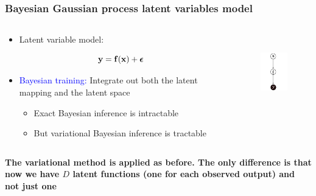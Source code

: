 \documentclass{beamer}
\begin{document}
\frame
{
\frametitle{Bayesian Gaussian process latent variables model}


\begin{columns}
\begin{column}[t]{8cm}

\begin{itemize}
\item Latent variable model: 

$$
\mathbf{y}  = \mathbf{f}(\mathbf{x})  + \boldsymbol{\epsilon} 
$$

\item \textcolor{blue}{Bayesian training:} Integrate out both the latent mapping 
      and the latent space  

\begin{itemize}

\item Exact Bayesian inference is intractable 

\item But variational Bayesian inference is tractable 
 

\end{itemize}
\end{itemize}

\end{column}

\begin{column}[t]{4cm}
\begin{figure}
\includegraphics[width=25mm,height=33mm]{../../../vargplvm/tex/diagrams/Figure1}
\end{figure}

\end{column}
\end{columns}

\vspace{0.5cm}
 

{\bf The variational method is applied as before. The only 
      difference is that now we have $D$ latent functions 
      (one for each observed output)
 and not just one}  

}
\end{document}

